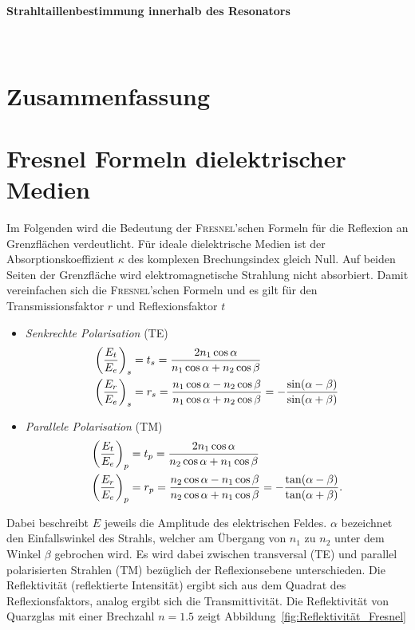 \documentclass[a4paper,twoside,final]{article}
\begin{document}
\paragraph{Strahltaillenbestimmung innerhalb des Resonators}$~$




\FloatBarrier
\newpage
\section{Zusammenfassung}

\appendix
\section{Fresnel Formeln dielektrischer Medien}
Im Folgenden wird die Bedeutung der \textsc{Fresnel}'schen Formeln für die Reflexion an Grenzflächen verdeutlicht. Für ideale dielektrische Medien ist der Absorptionskoeffizient $\kappa$ des komplexen Brechungsindex gleich Null. Auf beiden Seiten der Grenzfläche wird elektromagnetische Strahlung nicht absorbiert. Damit vereinfachen sich die \textsc{Fresnel}'schen Formeln und es gilt für den Transmissionsfaktor $r$ und Reflexionsfaktor $t$~\cite{Demtröder2}
\begin{itemize}
  \item \emph{Senkrechte Polarisation} (TE)
  \begin{align}
    \qty(\frac{E_t}{E_e})_s &= t_s = \frac{2 n_1 \cos \alpha}{n_1 \cos\alpha + n_2 \cos \beta}\\
    \qty(\frac{E_r}{E_e})_s &= r_s = \frac{n_1 \cos\alpha - n_2 \cos\beta}{n_1 \cos\alpha + n_2 \cos \beta} = -\frac{\sin(\alpha -\beta)}{\sin(\alpha + \beta)}
  \end{align}
  \item \emph{Parallele Polarisation} (TM)
  \begin{align}
    \qty(\frac{E_t}{E_e})_p &= t_p = \frac{2 n_1 \cos \alpha}{n_2 \cos\alpha + n_1 \cos \beta}\\
    \qty(\frac{E_r}{E_e})_p &= r_p = \frac{n_2 \cos\alpha - n_1 \cos\beta}{n_2 \cos\alpha + n_1 \cos \beta} = -\frac{\tan(\alpha -\beta)}{\tan(\alpha + \beta)}.\label{eqn:Parallele_Polarisation}
  \end{align}
\end{itemize}
Dabei beschreibt $E$ jeweils die Amplitude des elektrischen Feldes. $\alpha$ bezeichnet den Einfallswinkel des Strahls, welcher am Übergang von $n_1$ zu $n_2$ unter dem Winkel $\beta$ gebrochen wird.
Es wird dabei zwischen transversal (TE) und parallel polarisierten Strahlen (TM) bezüglich der Reflexionsebene unterschieden. Die Reflektivität (reflektierte Intensität) ergibt sich aus dem Quadrat des Reflexionsfaktors, analog ergibt sich die Transmittivität. Die Reflektivität von Quarzglas mit einer Brechzahl $n = 1.5$ zeigt Abbildung~\ref{fig:Reflektivität_Fresnel}
\end{document}
